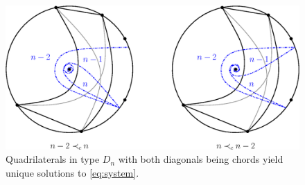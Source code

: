 \documentclass[pdftex]{sigma}
\numberwithin{equation}{section}
\numberwithin{figure}{section}
\begin{document}
  \begin{figure}
    \begin{center}
      \includegraphics[scale=0.7]{D_n-roots.eps}
    \end{center}
    \caption{Quadrilaterals in type $D_n$ with both diagonals being chords yield unique solutions to \cref{eq:system}.}
    \label{fig:D_n-roots}
  \end{figure}
\end{document}
